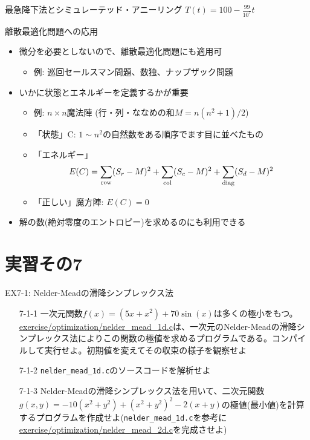 \documentclass[dvipdfmx]{beamer}
\begin{document}
\begin{frame}[t,fragile]{最急降下法とシミュレーテッド・アニーリング}
  \hspace*{17em}$T(t) = 100 - \frac{99}{10^7} t$
\end{frame}

\begin{frame}[t,fragile]{離散最適化問題への応用}
  \begin{itemize}
    \setlength{\itemsep}{1em}
  \item 微分を必要としないので、離散最適化問題にも適用可
    \begin{itemize}
    \item 例: 巡回セールスマン問題、数独、ナップザック問題
    \end{itemize}
  \item いかに状態とエネルギーを定義するかが重要
    \begin{itemize}
    \item 例: $n \times n$魔法陣 (行・列・ななめの和$M = n(n^2+1)/2$)
    \item 「状態」C: $1\sim n^2$の自然数をある順序でます目に並べたもの
    \item 「エネルギー」
      \[
      E(C) = \sum_{\rm row} (S_r-M)^2 + \sum_{\rm col} (S_c-M)^2 + \sum_{\rm diag} (S_d-M)^2
      \]
    \item 「正しい」魔方陣: $E(C) = 0$
    \end{itemize}
  \item 解の数(絶対零度のエントロピー)を求めるのにも利用できる
  \end{itemize}
\end{frame}

\section{実習その7}

\begin{frame}[t,fragile]{EX7-1: Nelder-Meadの滑降シンプレックス法}
  \begin{itemize}
  \item[7-1-1] 一次元関数$f(x)=(5x+x^2)+70\sin(x)$は多くの極小をもつ。\href{https://github.com/todo-group/computer-experiments/exercise/optimization/nelder_mead_1d.c}{exercise/optimization/nelder\_mead\_1d.c}は、一次元のNelder-Meadの滑降シンプレックス法によりこの関数の極値を求めるプログラムである。コンパイルして実行せよ。初期値を変えてその収束の様子を観察せよ
  \item[7-1-2] {\tt nelder\_mead\_1d.c}のソースコードを解析せよ
  \item[7-1-3] Nelder-Meadの滑降シンプレックス法を用いて、二次元関数$g(x,y)=-10(x^2+y^2)+(x^2+y^2)^2-2(x+y)$の極値(最小値)を計算するプログラムを作成せよ({\tt nelder\_mead\_1d.c}を参考に\href{https://github.com/todo-group/computer-experiments/exercise/optimization/nelder_mead_2d.c}{exercise/optimization/nelder\_mead\_2d.c}を完成させよ)
  \end{itemize}
\end{frame}
\end{document}
